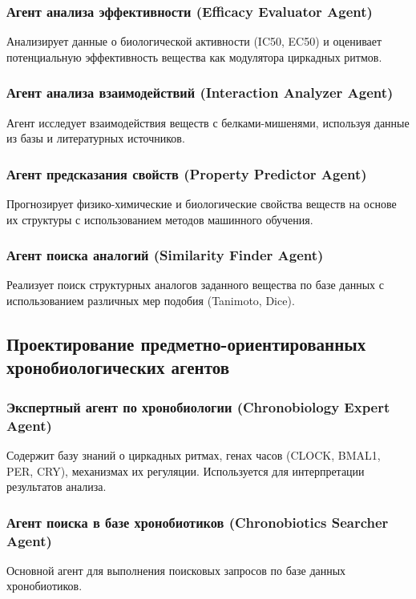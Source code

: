 \documentclass[a4paper,14pt]{extarticle}
\begin{document}
	\subsubsection{Агент анализа эффективности (Efficacy Evaluator Agent)}
	Анализирует данные о биологической активности (IC50, EC50) и оценивает потенциальную эффективность вещества как модулятора циркадных ритмов.
	
	\subsubsection{Агент анализа взаимодействий (Interaction Analyzer Agent)}
	Агент исследует взаимодействия веществ с белками-мишенями, используя данные из базы и литературных источников.
	
	\subsubsection{Агент предсказания свойств (Property Predictor Agent)}
	Прогнозирует физико-химические и биологические свойства веществ на основе их структуры с использованием методов машинного обучения.
	
	\subsubsection{Агент поиска аналогий (Similarity Finder Agent)}
	Реализует поиск структурных аналогов заданного вещества по базе данных с использованием различных мер подобия (Tanimoto, Dice).
	
	\subsection{Проектирование предметно-ориентированных хронобиологических агентов}
	
	\subsubsection{Экспертный агент по хронобиологии (Chronobiology Expert Agent)}
	Содержит базу знаний о циркадных ритмах, генах часов (CLOCK, BMAL1, PER, CRY), механизмах их регуляции. Используется для интерпретации результатов анализа.
	
	\subsubsection{Агент поиска в базе хронобиотиков (Chronobiotics Searcher Agent)}
	Основной агент для выполнения поисковых запросов по базе данных хронобиотиков.
	
\end{document}
